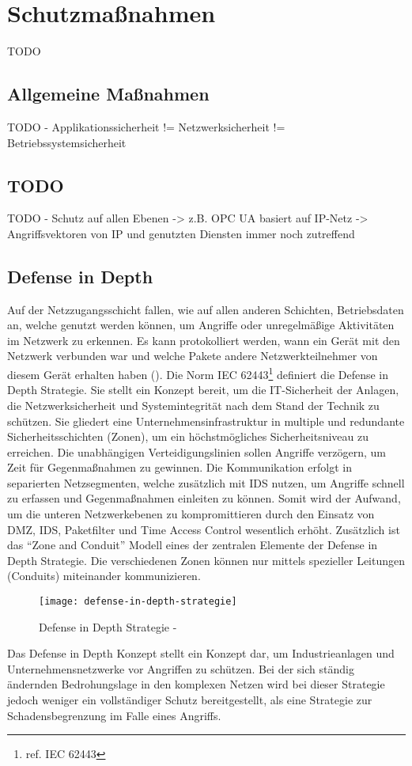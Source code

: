 \section{Schutzmaßnahmen}
TODO 

\subsection{Allgemeine Maßnahmen}
TODO - Applikationssicherheit != Netzwerksicherheit != Betriebssystemsicherheit

\subsection{TODO}
TODO - Schutz auf allen Ebenen -> z.B. OPC UA basiert auf IP-Netz -> Angriffsvektoren von IP und genutzten Diensten immer noch zutreffend

\subsection{Defense in Depth}
Auf der Netzzugangsschicht fallen, wie auf allen anderen Schichten, Betriebsdaten an, welche genutzt werden können, um Angriffe oder unregelmäßige Aktivitäten im Netzwerk zu erkennen. Es kann protokolliert werden, wann ein Gerät mit den Netzwerk verbunden war und welche Pakete andere Netzwerkteilnehmer von diesem Gerät erhalten haben (\cite{sichKom2017}). Die Norm IEC 62443\footnote{ref. IEC 62443} definiert die Defense in Depth Strategie. Sie stellt ein Konzept bereit, um die IT-Sicherheit der Anlagen, die Netzwerksicherheit und Systemintegrität nach dem Stand der Technik zu schützen. Sie gliedert eine Unternehmensinfrastruktur in multiple und redundante Sicherheitsschichten (Zonen), um ein höchstmögliches Sicherheitsniveau zu erreichen. Die unabhängigen Verteidigungslinien sollen Angriffe verzögern, um Zeit für Gegenmaßnahmen zu gewinnen. Die Kommunikation erfolgt in separierten Netzsegmenten, welche zusätzlich mit \ac{IDS} nutzen, um Angriffe schnell zu erfassen und Gegenmaßnahmen einleiten zu können. Somit wird der Aufwand, um die unteren Netzwerkebenen zu kompromittieren durch den Einsatz von \ac{DMZ}, \ac{IDS}, Paketfilter und Time Access Control wesentlich erhöht. Zusätzlich ist das "`Zone and Conduit"' Modell eines der zentralen Elemente der Defense in Depth Strategie. Die verschiedenen Zonen können nur mittels spezieller Leitungen (Conduits) miteinander kommunizieren.  

\begin{figure}[h]
    \centering
    \texttt{[image: defense-in-depth-strategie]}
    \caption{Defense in Depth Strategie - \cite{kuipers2006}}
    \label{Kap3:Defense-in-Depth}
\end{figure}

\clearpage

Das Defense in Depth Konzept stellt ein Konzept dar, um Industrieanlagen und Unternehmensnetzwerke vor Angriffen zu schützen. Bei der sich ständig ändernden Bedrohungslage in den komplexen Netzen wird bei dieser Strategie jedoch weniger ein vollständiger Schutz bereitgestellt, als eine Strategie zur Schadensbegrenzung im Falle eines Angriffs.